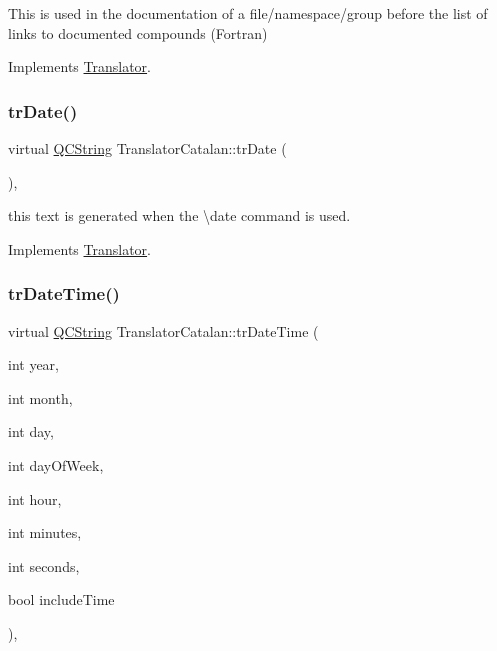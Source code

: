 This is used in the documentation of a file/namespace/group before the list of links to documented compounds (Fortran) 

Implements \mbox{\hyperlink{class_translator}{Translator}}.

\mbox{\label{class_translator_catalan_af0e2d79681112825fd837b2144001b88}} 
\subsubsection{\texorpdfstring{trDate()}{trDate()}}
{\footnotesize\ttfamily virtual \mbox{\hyperlink{class_q_c_string}{Q\+C\+String}} Translator\+Catalan\+::tr\+Date (\begin{DoxyParamCaption}{ }\end{DoxyParamCaption})\hspace{0.3cm}{\ttfamily [inline]}, {\ttfamily [virtual]}}

this text is generated when the \textbackslash{}date command is used. 

Implements \mbox{\hyperlink{class_translator}{Translator}}.

\mbox{\label{class_translator_catalan_af79c64f486cb2a02a213b33e63a2cc66}} 
\subsubsection{\texorpdfstring{trDateTime()}{trDateTime()}}
{\footnotesize\ttfamily virtual \mbox{\hyperlink{class_q_c_string}{Q\+C\+String}} Translator\+Catalan\+::tr\+Date\+Time (\begin{DoxyParamCaption}\item[{int}]{year,  }\item[{int}]{month,  }\item[{int}]{day,  }\item[{int}]{day\+Of\+Week,  }\item[{int}]{hour,  }\item[{int}]{minutes,  }\item[{int}]{seconds,  }\item[{bool}]{include\+Time }\end{DoxyParamCaption})\hspace{0.3cm}{\ttfamily [inline]}, {\ttfamily [virtual]}}

